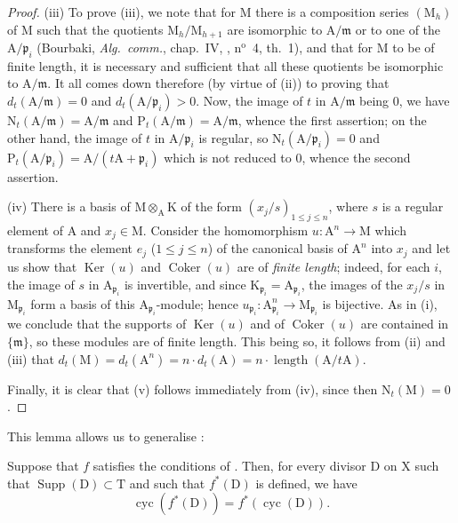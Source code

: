 \begin{proof}
(iii) To prove (iii), we note that for $\mathrm{M}$ there is a composition series $(\mathrm{M}_h)$ of $\mathrm{M}$ such that the quotients $\mathrm{M}_h/\mathrm{M}_{h+1}$ are isomorphic to $\mathrm{A}/\mathfrak{m}$ or to one of the $\mathrm{A}/\mathfrak{p}_i$ (Bourbaki, \emph{Alg.\ comm.}, chap.~IV, , n$^{\mathrm{o}}$~4, th.~1), and that for $\mathrm{M}$ to be of finite length, it is necessary and sufficient that all these quotients be isomorphic to $\mathrm{A}/\mathfrak{m}$.
It all comes down therefore (by virtue of (ii)) to proving that $d_t(\mathrm{A}/\mathfrak{m})=0$ and $d_t(\mathrm{A}/\mathfrak{p}_i)>0$.
Now, the image of $t$ in $\mathrm{A}/\mathfrak{m}$ being $0$, we have $\mathrm{N}_t(\mathrm{A}/\mathfrak{m})=\mathrm{A}/\mathfrak{m}$ and $\mathrm{P}_t(\mathrm{A}/\mathfrak{m})=\mathrm{A}/\mathfrak{m}$, whence the first assertion; on the other hand, the image of $t$ in $\mathrm{A}/\mathfrak{p}_i$ is regular, so $\mathrm{N}_t(\mathrm{A}/\mathfrak{p}_i)=0$ and $\mathrm{P}_t(\mathrm{A}/\mathfrak{p}_i)=\mathrm{A}/(t\mathrm{A}+\mathfrak{p}_i)$ which is not reduced to $0$, whence the second assertion.

(iv) There is a basis of $\mathrm{M}\otimes_{\mathrm{A}}\mathrm{K}$ of the form $(x_j/s)_{1\leq j\leq n}$, where $s$ is a regular element of $\mathrm{A}$ and $x_j\in\mathrm{M}$.
Consider the homomorphism $u:\mathrm{A}^n\to\mathrm{M}$ which transforms the element $e_j$ ($1\leq j\leq n$) of the canonical basis of $\mathrm{A}^n$ into $x_j$ and let us show that $\operatorname{Ker}(u)$ and $\operatorname{Coker}(u)$ are of \emph{finite length}; indeed, for each $i$, the image of $s$ in $\mathrm{A}_{\mathfrak{p}_i}$ is invertible, and since $\mathrm{K}_{\mathfrak{p}_i}=\mathrm{A}_{\mathfrak{p}_i}$, the images of the $x_j/s$ in $\mathrm{M}_{\mathfrak{p}_i}$ form a basis of this $\mathrm{A}_{\mathfrak{p}_i}$-module; hence $u_{\mathfrak{p}_i}:\mathrm{A}_{\mathfrak{p}_i}^n\to\mathrm{M}_{\mathfrak{p}_i}$ is bijective.
As in (i), we conclude that the supports of $\operatorname{Ker}(u)$ and of $\operatorname{Coker}(u)$ are contained in $\{\mathfrak{m}\}$, so these modules are of finite length.
This being so, it follows from (ii) and (iii) that $d_t(\mathrm{M})=d_t(\mathrm{A}^n)=n\cdot d_t(\mathrm{A})=n\cdot\operatorname{length}(\mathrm{A}/t\mathrm{A})$.

Finally, it is clear that (v) follows immediately from (iv), since then $\mathrm{N}_t(\mathrm{M})=0$.
\end{proof}

This lemma allows us to generalise :
\begin{proposition}[21.10.13*]
\label{IV.21.10.13bis}
Suppose that $f$ satisfies the conditions of .
Then, for every divisor $\mathrm{D}$ on $\mathrm{X}$ such that $\operatorname{Supp}(\mathrm{D})\subset\mathrm{T}$ and such that $f^*(\mathrm{D})$ is defined, we have
\[
\label{IV.21.10.13.1}
  \operatorname{cyc}(f^*(\mathrm{D}))=f^*(\operatorname{cyc}(\mathrm{D})).
  \tag{21.10.13.1}
\]
\end{proposition}

